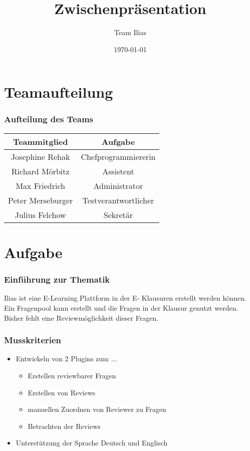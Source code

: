\documentclass{beamer}
\title{Zwischenpräsentation}
\author{Team Ilias}
\date{\today}
\begin{document}
	\maketitle
	\frame{\tableofcontents[]}

	\section{Teamaufteilung}
	\begin{frame}
		\frametitle{Aufteilung des Teams}
		\begin{tabular}{|c|c|}\hline
			Teammitglied & Aufgabe \\\hline
			Josephine Rehak & Chefprogrammiererin\\\hline
			Richard Mörbitz & Assistent\\\hline
			Max Friedrich & Administrator\\\hline
			Peter Merseburger & Testverantwortlicher\\\hline
			Julius Felchow & Sekretär\\\hline
		\end{tabular}
	\end{frame} 
 
	\section{Aufgabe}
		\begin{frame} %
			\frametitle{Einführung zur Thematik} %
  			Ilias ist eine E-Learning Plattform in der E-					Klausuren erstellt werden können. Ein Fragenpool 				kann erstellt und die Fragen in der Klausur 					genutzt werden.\\
    		Bisher fehlt eine Reviewmöglichkeit dieser Fragen.
		\end{frame}

		\begin{frame} %
			\frametitle{Musskriterien} %
	    	\begin{itemize}
	    		\item Entwickeln von 2 Plugins zum ... 
	    			\begin{itemize}
	    				\item Erstellen reviewbarer Fragen
	    				\item Erstellen von Reviews
    					\item manuellen Zuordnen von Reviewer 							zu Fragen
    					\item Betrachten der Reviews
					\end{itemize}    			
    			\item Unterstützung der Sprache Deutsch und 					Englisch
    		\end{itemize}
		\end{frame}
\end{document}
